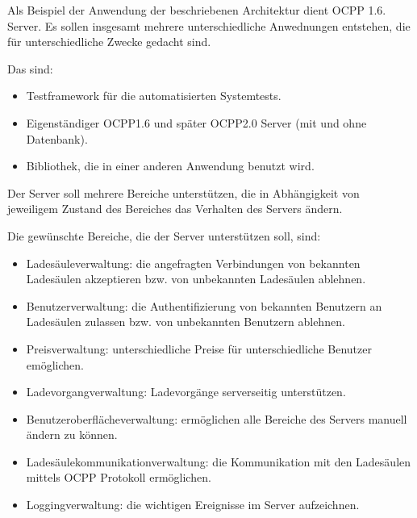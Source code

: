 Als Beispiel der Anwendung der beschriebenen Architektur dient OCPP 1.6. Server.
Es sollen insgesamt mehrere unterschiedliche Anwednungen entstehen, die für unterschiedliche 
Zwecke gedacht sind.

Das sind:
\begin{itemize}
    \item Testframework für die automatisierten Systemtests.
    \item Eigenständiger OCPP1.6 und später OCPP2.0 Server (mit und ohne Datenbank).
    \item Bibliothek, die in einer anderen Anwendung benutzt wird.
\end{itemize}

Der Server soll mehrere Bereiche unterstützen, 
die in Abhängigkeit von jeweiligem Zustand des Bereiches das Verhalten des Servers ändern.

Die gewünschte Bereiche, die der Server unterstützen soll, sind:
\begin{itemize}
    \item Ladesäuleverwaltung: die angefragten Verbindungen von bekannten Ladesäulen akzeptieren bzw. von unbekannten Ladesäulen ablehnen.
    \item Benutzerverwaltung: die Authentifizierung von bekannten Benutzern an Ladesäulen zulassen bzw. von unbekannten Benutzern ablehnen.
    \item Preisverwaltung: unterschiedliche Preise für unterschiedliche Benutzer emöglichen.
    \item Ladevorgangverwaltung: Ladevorgänge serverseitig unterstützen.
    \item Benutzeroberflächeverwaltung: ermöglichen alle Bereiche des Servers manuell ändern zu können.
    \item Ladesäulekommunikationverwaltung: die Kommunikation mit den Ladesäulen mittels OCPP Protokoll ermöglichen.
    \item Loggingverwaltung: die wichtigen Ereignisse im Server aufzeichnen.
\end{itemize}